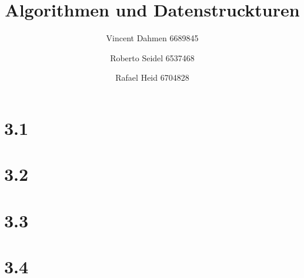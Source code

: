 \documentclass[12pt,a4paper]{article}
\title{Algorithmen und Datenstruckturen}
\author{Vincent Dahmen 6689845 \and Roberto Seidel 6537468 \and Rafael Heid 6704828}
\begin{document}
\maketitle{}


\section*{3.1}


\section*{3.2}


\section*{3.3}


\section*{3.4}

\end{document}
